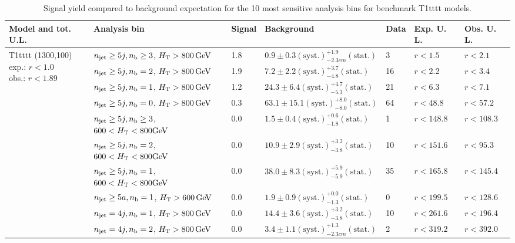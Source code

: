 \begin{table}[h!] 
  \scriptsize
  \caption{ 
Signal yield compared to background expectation for the 10 most sensitive analysis bins 
for benchmark T1tttt models.
  \label{tab:sigBenchmarksYields_T1tttt}}
  \centering 
  \begin{tabular}{ lllllll } 
    \hline 
    \hline 
    Model and tot. U.L. & Analysis bin & Signal & Background & Data & Exp. U. L. & Obs. U. L. \\ \hline
\multirow{10}{*}{\parbox[t]{2.3cm}{T1tttt (1300,100)\\exp.: $r<1.0$\\obs.: $r<1.89$}}
 & $n_{\mathrm{jet}} \geq5j,n_{\text{b}} \geq3$, $\mbox{$H_\text{T}$} > 800 \, \mathrm{GeV}$ & 1.8 & $0.9 \pm 0.3 \mathrm{(syst.)} ^{+1.9}_{-2.3cm} \mathrm{(stat.)}$ & 3 & $r < 1.5$ & $r < 2.1$\\ 
 & $n_{\mathrm{jet}} \geq5j,n_{\text{b}} =2$, $\mbox{$H_\text{T}$} > 800 \, \mathrm{GeV}$ & 1.9 & $7.2 \pm 2.2 \mathrm{(syst.)} ^{+3.7}_{-4.8} \mathrm{(stat.)}$ & 16 & $r < 2.2$ & $r < 3.4$\\ 
 & $n_{\mathrm{jet}} \geq5j,n_{\text{b}} =1$, $\mbox{$H_\text{T}$} > 800 \, \mathrm{GeV}$ & 1.2 & $24.3 \pm 6.4 \mathrm{(syst.)} ^{+4.7}_{-5.3} \mathrm{(stat.)}$ & 21 & $r < 6.3$ & $r < 7.1$\\ 
 & $n_{\mathrm{jet}} \geq5j,n_{\text{b}} =0$, $\mbox{$H_\text{T}$} > 800 \, \mathrm{GeV}$ & 0.3 & $63.1 \pm 15.1 \mathrm{(syst.)} ^{+8.0}_{-8.0} \mathrm{(stat.)}$ & 64 & $r < 48.8$ & $r < 57.2$\\ 
 & $n_{\mathrm{jet}} \geq5j,n_{\text{b}} \geq3$, $600 < \mbox{$H_\text{T}$} < 800 \mathrm{GeV}$ & 0.0 & $1.5 \pm 0.4 \mathrm{(syst.)} ^{+0.6}_{-1.8} \mathrm{(stat.)}$ & 1 & $r < 148.8$ & $r < 108.3$\\ 
 & $n_{\mathrm{jet}} \geq5j,n_{\text{b}} =2$, $600 < \mbox{$H_\text{T}$} < 800 \mathrm{GeV}$ & 0.0 & $10.9 \pm 2.9 \mathrm{(syst.)} ^{+3.2}_{-3.8} \mathrm{(stat.)}$ & 10 & $r < 151.6$ & $r < 95.3$\\ 
 & $n_{\mathrm{jet}} \geq5j,n_{\text{b}} =1$, $600 < \mbox{$H_\text{T}$} < 800 \mathrm{GeV}$ & 0.0 & $38.0 \pm 8.3 \mathrm{(syst.)} ^{+5.9}_{-5.9} \mathrm{(stat.)}$ & 35 & $r < 165.8$ & $r < 145.4$\\ 
 & $n_{\mathrm{jet}} \geq5a,n_{\text{b}} =1$, $\mbox{$H_\text{T}$} > 600 \, \mathrm{GeV}$ & 0.0 & $1.9 \pm 0.9 \mathrm{(syst.)} ^{+0.0}_{-1.3} \mathrm{(stat.)}$ & 0 & $r < 199.5$ & $r < 128.6$\\ 
 & $n_{\mathrm{jet}} =4j,n_{\text{b}} =1$, $\mbox{$H_\text{T}$} > 800 \, \mathrm{GeV}$ & 0.0 & $14.4 \pm 3.6 \mathrm{(syst.)} ^{+3.2}_{-3.8} \mathrm{(stat.)}$ & 10 & $r < 261.6$ & $r < 196.4$\\ 
 & $n_{\mathrm{jet}} =4j,n_{\text{b}} =2$, $\mbox{$H_\text{T}$} > 800 \, \mathrm{GeV}$ & 0.0 & $3.4 \pm 1.1 \mathrm{(syst.)} ^{+1.3}_{-2.3cm} \mathrm{(stat.)}$ & 2 & $r < 319.2$ & $r < 392.0$\\ \hline

\end{tabular}
\end{table}
